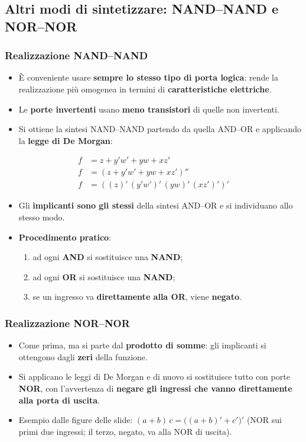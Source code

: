 \documentclass[12pt, a4paper]{article}
\begin{document}
\subsection{Altri modi di sintetizzare: NAND--NAND e NOR--NOR}

\subsubsection{Realizzazione NAND--NAND}
\begin{itemize}
    \item È conveniente usare \textbf{sempre lo stesso tipo di porta logica}: rende la realizzazione più omogenea in termini di \textbf{caratteristiche elettriche}.
    \item Le \textbf{porte invertenti} usano \textbf{meno transistori} di quelle non invertenti.
    \item Si ottiene la sintesi NAND--NAND partendo da quella AND--OR e applicando la \textbf{legge di De Morgan}:
\end{itemize}
\begin{align*}
f &= z + y'w' + yw + xz' \\
f &= (z + y'w' + yw + xz')'' \\
f &= ((z)'\,(y'w')'\,(yw)'\,(xz')')'
\end{align*}
\begin{itemize}
    \item Gli \textbf{implicanti sono gli stessi} della sintesi AND--OR e si individuano allo stesso modo.
    \item \textbf{Procedimento pratico}:
    \begin{enumerate}
        \item ad ogni \textbf{AND} si sostituisce una \textbf{NAND};
        \item ad ogni \textbf{OR} si sostituisce una \textbf{NAND};
        \item se un ingresso va \textbf{direttamente alla OR}, viene \textbf{negato}.
    \end{enumerate}
\end{itemize}

\subsubsection{Realizzazione NOR--NOR}
\begin{itemize}
    \item Come prima, ma si parte dal \textbf{prodotto di somme}: gli implicanti si ottengono dagli \textbf{zeri} della funzione.
    \item Si applicano le leggi di De Morgan e di nuovo si sostituisce tutto con porte \textbf{NOR}, con l'avvertenza di \textbf{negare gli ingressi che vanno direttamente alla porta di uscita}.
    \item Esempio dalle figure delle slide: $(a + b)\,c = \big((a + b)' + c'\big)'$ (NOR sui primi due ingressi; il terzo, negato, va alla NOR di uscita).
\end{itemize}
\end{document}
